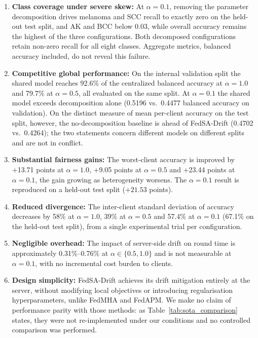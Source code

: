\documentclass{ieeeaccess}
\newcommand{\sadrift}{FedSA-Drift}
\begin{document}
\begin{enumerate}
    \item \textbf{Class coverage under severe skew:} At $\alpha{=}0.1$, removing the parameter decomposition drives melanoma and SCC recall to exactly zero on the held-out test split, and AK and BCC below 0.03, while overall accuracy remains the highest of the three configurations. Both decomposed configurations retain non-zero recall for all eight classes. Aggregate metrics, balanced accuracy included, do not reveal this failure.
    \item \textbf{Competitive global performance:} On the internal validation split the shared model reaches 92.6\% of the centralized balanced accuracy at $\alpha{=}1.0$ and 79.7\% at $\alpha{=}0.5$, all evaluated on the same split. At $\alpha{=}0.1$ the shared model exceeds decomposition alone (0.5196 vs.\ 0.4477 balanced accuracy on validation). On the distinct measure of mean per-client accuracy on the test split, however, the no-decomposition baseline is ahead of \sadrift{} (0.4702 vs.\ 0.4264); the two statements concern different models on different splits and are not in conflict.
    \item \textbf{Substantial fairness gains:} The worst-client accuracy is improved by +13.71 points at $\alpha{=}1.0$, +9.05 points at $\alpha{=}0.5$ and +23.44 points at $\alpha{=}0.1$, the gain growing as heterogeneity worsens. The $\alpha{=}0.1$ result is reproduced on a held-out test split ($+21.53$ points).
    \item \textbf{Reduced divergence:} The inter-client standard deviation of accuracy decreases by 58\% at $\alpha{=}1.0$, 39\% at $\alpha{=}0.5$ and 57.4\% at $\alpha{=}0.1$ (67.1\% on the held-out test split), from a single experimental trial per configuration.
    \item \textbf{Negligible overhead:} The impact of server-side drift on round time is approximately 0.31\%--0.76\% at $\alpha \in \{0.5, 1.0\}$ and is not measurable at $\alpha{=}0.1$, with no incremental cost burden to clients.
    \item \textbf{Design simplicity:} \sadrift{} achieves its drift mitigation entirely at the server, without modifying local objectives or introducing regularisation hyperparameters, unlike FedMHA and FedAPM. We make no claim of performance parity with those methods: as Table~\ref{tab:sota_comparison} states, they were not re-implemented under our conditions and no controlled comparison was performed.
\end{enumerate}
\end{document}
